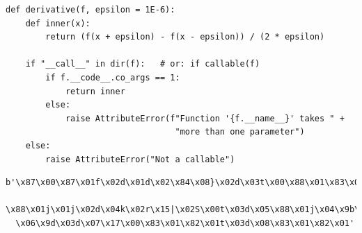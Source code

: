 \begin{frame}[fragile]
%
\begin{codebox}
\begin{verbatim}
def derivative(f, epsilon = 1E-6):
    def inner(x):
        return (f(x + epsilon) - f(x - epsilon)) / (2 * epsilon)
    
    if "__call__" in dir(f):   # or: if callable(f)
        if f.__code__.co_args == 1:
            return inner
        else:
            raise AttributeError(f"Function '{f.__name__}' takes " + 
                                  "more than one parameter")
    else:
        raise AttributeError("Not a callable")
\end{verbatim}
\end{codebox}
%
\begin{cmdbox}
\begin{verbatim}
b'\x87\x00\x87\x01f\x02d\x01d\x02\x84\x08}\x02d\x03t\x00\x88\x01\x83\x01v\x00r
  \x88\x01j\x01j\x02d\x04k\x02r\x15|\x02S\x00t\x03d\x05\x88\x01j\x04\x9b\x00d
  \x06\x9d\x03d\x07\x17\x00\x83\x01\x82\x01t\x03d\x08\x83\x01\x82\x01'
\end{verbatim}
\end{cmdbox}
%
\end{frame}


